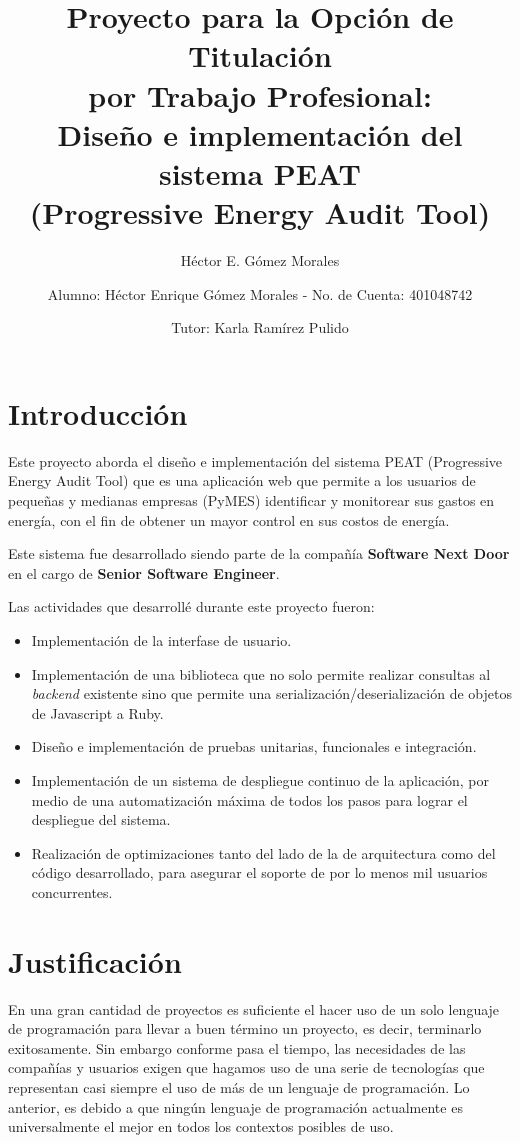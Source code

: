 \documentclass{article}
\author{Héctor E. Gómez Morales}
\title{Proyecto para la Opción de Titulación\\
  por Trabajo Profesional:\\
  Diseño e implementación del sistema PEAT\\
  (Progressive Energy Audit Tool)}
\begin{document}
\author{ Alumno: Héctor Enrique Gómez Morales - No. de Cuenta: 401048742 \and
  Tutor: Karla Ramírez Pulido}
\maketitle
\section{Introducción}
Este proyecto aborda el diseño e implementación del sistema
PEAT (Progressive Energy Audit Tool) que es una aplicación web que
permite a los usuarios de pequeñas y medianas empresas (PyMES)
identificar y monitorear sus gastos en energía, con el fin de obtener
un mayor control en sus costos de energía.

Este sistema fue desarrollado siendo parte de la compañía
\textbf{Software Next Door} en el cargo de \textbf{Senior Software Engineer}.

Las actividades que desarrollé durante este proyecto fueron:
\begin{itemize}
\item Implementación de la interfase de usuario.
\item Implementación de una biblioteca que no solo permite realizar consultas
  al \textit{backend} existente sino que permite una serialización/deserialización
  de objetos de Javascript a Ruby.
\item Diseño e implementación de pruebas unitarias, funcionales e integración.
\item Implementación de un sistema de despliegue continuo de la aplicación, por
  medio de una automatización máxima de todos los pasos para lograr el despliegue
  del sistema.
\item Realización de optimizaciones tanto del lado de la de arquitectura como
  del código desarrollado, para asegurar el soporte de por lo menos mil usuarios concurrentes.
\end{itemize}

\section{Justificación}
En una gran cantidad de proyectos es suficiente
el hacer uso de un solo lenguaje de programación para llevar a buen
término un proyecto, es decir, terminarlo exitosamente.
Sin embargo conforme pasa el tiempo, las necesidades
de las compañías y usuarios exigen que hagamos uso de una serie de
tecnologías que representan casi siempre el uso de más de un lenguaje
de programación. Lo anterior, es debido a que ningún lenguaje de programación
actualmente es universalmente el mejor en todos los contextos posibles de uso.
\end{document}
